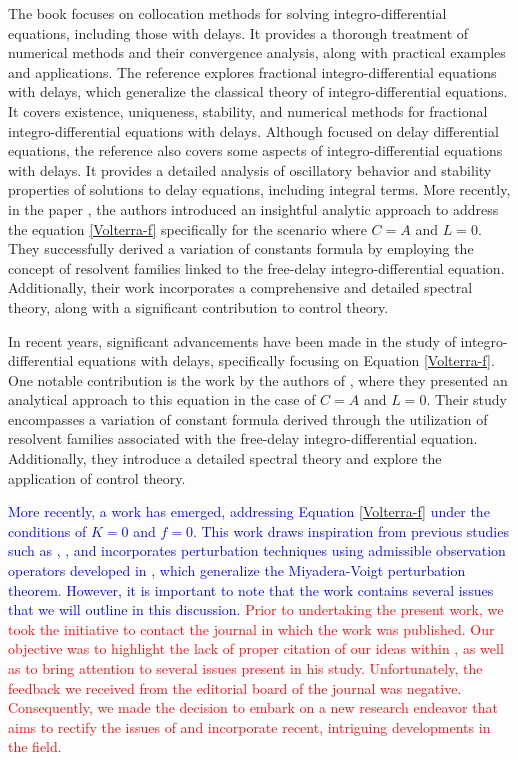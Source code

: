 \documentclass[12pt]{amsart}
\theoremstyle{definition}
\theoremstyle{remark}
\theoremstyle{example}
\begin{document}
The book \cite{Brun-02} focuses on collocation methods for solving integro-differential equations, including those with delays. It provides a thorough treatment of numerical methods and their convergence analysis, along with practical examples and applications. The reference \cite{LMN-17} explores fractional integro-differential equations with delays, which generalize the classical theory of integro-differential equations. It covers existence, uniqueness, stability, and numerical methods for fractional integro-differential equations with delays. Although focused on delay differential equations, the reference \cite{GL-91} also covers some aspects of integro-differential equations with delays. It provides a detailed analysis of oscillatory behavior and stability properties of solutions to delay equations, including integral terms. More recently, in the paper \cite{EHB}, the authors introduced an insightful analytic approach to address the equation \eqref{Volterra-f} specifically for the scenario where $C=A$ and $L=0$. They successfully derived a variation of constants formula by employing the concept of resolvent families linked to the free-delay integro-differential equation. Additionally, their work incorporates a comprehensive and detailed spectral theory, along with a significant contribution to control theory.

In recent years, significant advancements have been made in the study of integro-differential equations with delays, specifically focusing on Equation \eqref{Volterra-f}. One notable contribution is the work by the authors of \cite{EHB}, where they presented an analytical approach to this equation in the case of $C=A$ and $L=0$. Their study encompasses a variation of constant formula derived through the utilization of resolvent families associated with the free-delay integro-differential equation. Additionally, they introduce a detailed spectral theory and explore the application of control theory.

\textcolor{blue}{More recently, a work \cite{Zaza} has emerged, addressing Equation \eqref{Volterra-f} under the conditions of $K=0$ and $f=0$. This work draws inspiration from previous studies such as \cite{ABDH}, \cite{EHB}, and incorporates perturbation techniques using admissible observation operators developed in \cite{Hadd}, which generalize the Miyadera-Voigt perturbation theorem. However, it is important to note that the work \cite{Zaza} contains several issues that we will outline in this discussion.} \textcolor{red} { Prior to undertaking the present work, we took the initiative to contact the journal in which the work \cite{Zaza} was published. Our objective was to highlight the lack of proper citation of our ideas within \cite{Zaza}, as well as to bring attention to several issues present in his study. Unfortunately, the feedback we received from the editorial board of the journal was negative. Consequently, we made the decision to embark on a new research endeavor that aims to rectify the issues of \cite{Zaza} and incorporate recent, intriguing developments in the field.}
\end{document}
